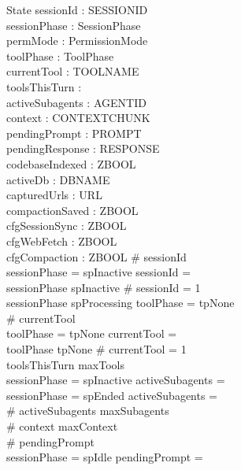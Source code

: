 \documentclass[a4paper,10pt,fleqn]{article}
\begin{document}
\begin{schema}{State}
  sessionId : \finset SESSIONID \\
  sessionPhase : SessionPhase \\
  permMode : PermissionMode \\
  toolPhase : ToolPhase \\
  currentTool : \finset TOOLNAME \\
  toolsThisTurn : \nat \\
  activeSubagents : \finset AGENTID \\
  context : \seq CONTEXTCHUNK \\
  pendingPrompt : \finset PROMPT \\
  pendingResponse : \finset RESPONSE \\
  codebaseIndexed : ZBOOL \\
  activeDb : \finset DBNAME \\
  capturedUrls : \finset URL \\
  compactionSaved : ZBOOL \\
  cfgSessionSync : ZBOOL \\
  cfgWebFetch : ZBOOL \\
  cfgCompaction : ZBOOL
  \where
  \# sessionId  \\
  sessionPhase = spInactive \implies sessionId = \emptyset \\
  sessionPhase \neq spInactive \implies \# sessionId = 1 \\
  sessionPhase \neq spProcessing \implies toolPhase = tpNone \\
  \# currentTool  \\
  toolPhase = tpNone \implies currentTool = \emptyset \\
  toolPhase \neq tpNone \implies \# currentTool = 1 \\
  toolsThisTurn \leq maxTools \\
  sessionPhase = spInactive \implies activeSubagents = \emptyset \\
  sessionPhase = spEnded \implies activeSubagents = \emptyset \\
  \# activeSubagents \leq maxSubagents \\
  \# context \leq maxContext \\
  \# pendingPrompt  \\
  sessionPhase = spIdle \implies pendingPrompt = \emptyset \\

\end{schema}
\end{document}
